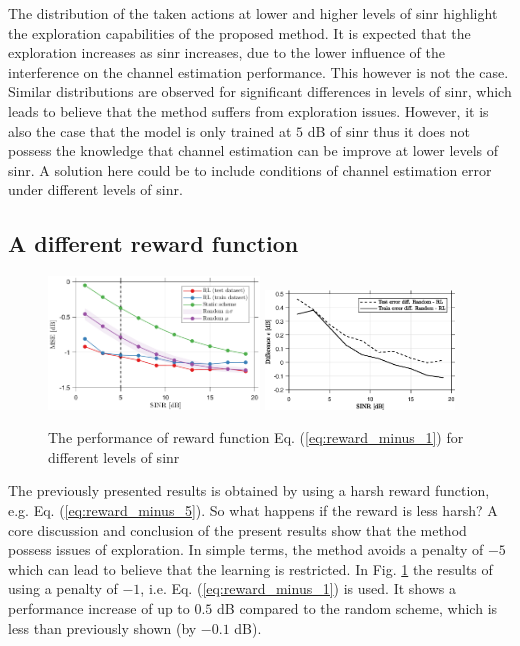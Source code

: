 The distribution of the taken actions at lower and higher levels of \gls{sinr} highlight the exploration capabilities of the proposed method. It is expected that the exploration increases as \gls{sinr} increases, due to the lower influence of the interference on the channel estimation performance. This however is not the case. Similar distributions are observed for significant differences in levels of \gls{sinr}, which leads to believe that the method suffers from exploration issues. However, it is also the case that the model is only trained at $5$ dB of \gls{sinr} thus it does not possess the knowledge that channel estimation can be improve at lower levels of \gls{sinr}. A solution here could be to include conditions of channel estimation error under different levels of \gls{sinr}.


\subsection{A different reward function}
\begin{figure}
    \centering
    \includegraphics[width=0.5\textwidth]{chapters/part_uplink/figures/results/rewardadjustsment_-1/SINR_sweep.eps}
    \includegraphics[width=0.45\textwidth]{chapters/part_uplink/figures/results/rewardadjustsment_-1/SINR_sweep_diff.eps}
    \caption{The performance of reward function Eq. (\ref{eq:reward_minus_1}) for different levels of \gls{sinr}}
    \label{fig:RL_different_reward_-1}
\end{figure}

\noindent The previously presented results is obtained by using a harsh reward function, e.g. Eq. (\ref{eq:reward_minus_5}). So what happens if the reward is less harsh? A core discussion and conclusion of the present results show that the method possess issues of exploration. In simple terms, the method avoids a penalty of $-5$ which can lead to believe that the learning is restricted. In Fig. \ref{fig:RL_different_reward_-1} the results of using a penalty of $-1$, i.e. Eq. (\ref{eq:reward_minus_1}) is used. It shows a performance increase of up to $0.5$ dB compared to the random scheme, which is less than previously shown (by $-0.1$ dB).   

